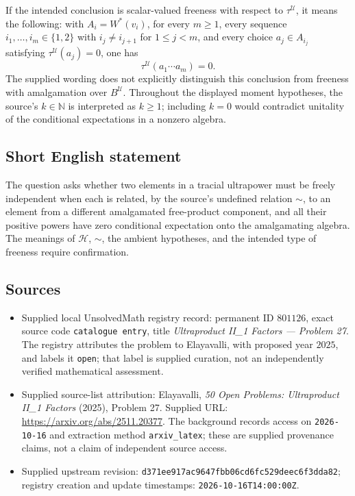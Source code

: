 \documentclass[11pt]{article}
\begin{document}
If the intended conclusion is scalar-valued freeness with respect to \(\tau^{\mathcal U}\), it means the following: with \(A_i=W^*(v_i)\), for every \(m\geq1\), every sequence \(i_1,\ldots,i_m\in\{1,2\}\) with \(i_j\ne i_{j+1}\) for \(1\leq j<m\), and every choice \(a_j\in A_{i_j}\) satisfying \(\tau^{\mathcal U}(a_j)=0\), one has
\[
\tau^{\mathcal U}(a_1\cdots a_m)=0.
\]
The supplied wording does not explicitly distinguish this conclusion from freeness with amalgamation over \(B^{\mathcal U}\). Throughout the displayed moment hypotheses, the source's \(k\in\mathbb N\) is interpreted as \(k\geq1\); including \(k=0\) would contradict unitality of the conditional expectations in a nonzero algebra.
\subsection{Short English statement}
The question asks whether two elements in a tracial ultrapower must be freely independent when each is related, by the source's undefined relation \(\sim\), to an element from a different amalgamated free-product component, and all their positive powers have zero conditional expectation onto the amalgamating algebra. The meanings of \(\mathcal H\), \(\sim\), the ambient hypotheses, and the intended type of freeness require confirmation.
\subsection{Sources}
\begin{itemize}
\item Supplied local UnsolvedMath registry record: permanent ID \(801126\), exact source code \texttt{catalogue entry}, title \emph{Ultraproduct II\_1 Factors --- Problem 27}. The registry attributes the problem to Elayavalli, with proposed year \(2025\), and labels it \texttt{open}; that label is supplied curation, not an independently verified mathematical assessment.
\item Supplied source-list attribution: Elayavalli, \emph{50 Open Problems: Ultraproduct II\_1 Factors} (2025), Problem 27. Supplied URL: \url{https://arxiv.org/abs/2511.20377}. The background records access on \texttt{2026-10-16} and extraction method \texttt{arxiv\_latex}; these are supplied provenance claims, not a claim of independent source access.
\item Supplied upstream revision: \texttt{d371ee917ac9647fbb06cd6fc529deec6f3dda82}; registry creation and update timestamps: \texttt{2026-10-16T14:00:00Z}.
\end{itemize}
\end{document}
